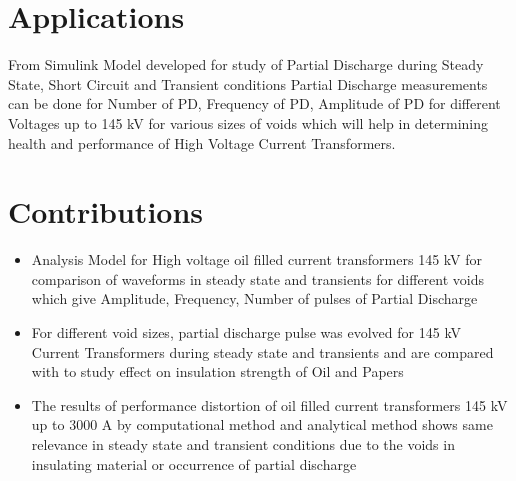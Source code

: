\section{Applications}
From Simulink Model developed for study of Partial Discharge during Steady State, Short Circuit and Transient conditions Partial Discharge measurements can be done for Number of PD, Frequency of PD, Amplitude of PD for different Voltages up to 145 kV for various sizes of voids which will help in determining health and performance of High Voltage Current Transformers.

\clearpage
\section{Contributions}
\begin{itemize}
\item Analysis Model for High voltage oil filled current transformers 145 kV for comparison of waveforms in steady state and transients for different voids which give Amplitude, Frequency, Number of pulses of Partial Discharge

\item For different void sizes, partial discharge pulse was evolved for 145 kV Current Transformers during steady state and transients and are compared with to study effect on insulation strength of Oil and Papers

\item The results of performance distortion of oil filled current transformers 145 kV up to 3000 A by computational method and analytical method shows same relevance in steady state and transient conditions due to the voids in insulating material or occurrence of partial discharge
\end{itemize}
\clearpage